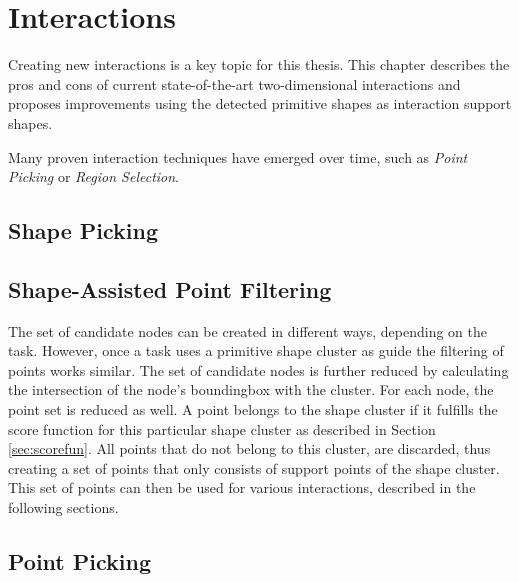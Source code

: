 \chapter{Interactions}

Creating new interactions is a key topic for this thesis. This chapter describes the pros and cons of current state-of-the-art two-dimensional interactions and proposes improvements using the detected primitive shapes as interaction support shapes. 

Many proven interaction techniques have emerged over time, such as \textit{Point Picking} or \textit{Region Selection}. 


\section{Shape Picking}

\section{Shape-Assisted Point Filtering}
\label{sec:pointFiltering}

The set of candidate nodes can be created in different ways, depending on the task. However, once a task uses a primitive shape cluster as guide the filtering of points works similar. The set of candidate nodes is further reduced by calculating the intersection of the node's boundingbox with the cluster. For each node, the point set is reduced as well. A point belongs to the shape cluster if it fulfills the score function for this particular shape cluster as described in Section \ref{sec:scorefun}. All points that do not belong to this cluster, are discarded, thus creating a set of points that only consists of support points of the shape cluster. This set of points can then be used for various interactions, described in the following sections. 

\section{Point Picking}
\label{sec:picking}

